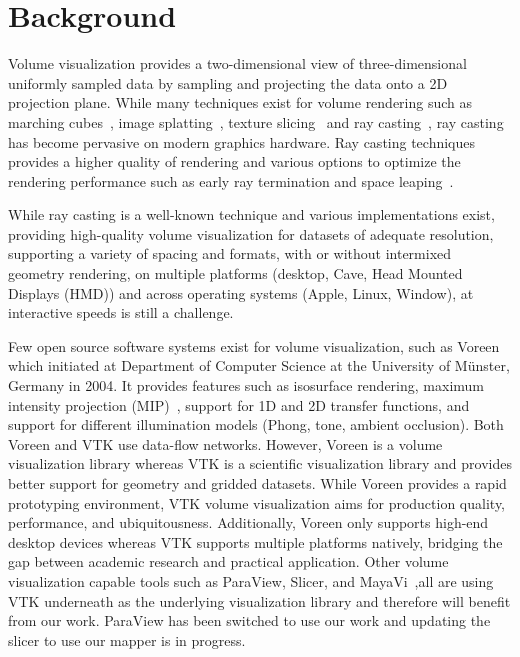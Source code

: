 \section{Background}
\label{relatedwork}

Volume visualization provides a two-dimensional view of three-dimensional
uniformly sampled data by sampling and projecting the data onto a 2D
projection plane.  While many techniques exist for volume rendering such as
marching cubes~\citep{lorensen_marching_1987}, image
splatting~\citep{westover_footprint_1990}, texture
slicing~\citep{rezk-salama_interactive_2000, engel_high-quality_2001} and ray
casting~\citep{hsu_segmented_1993, ma_parallel_1995, ma_scalable_1997,
heng_gpu-based_2005}, ray casting has become pervasive on modern graphics
hardware. Ray casting techniques provides a higher quality of rendering and
various options to optimize the rendering performance such as early ray
termination and space leaping~\citep{yagel_accelerating_1993}.

While ray casting is a well-known technique and various implementations exist,
providing high-quality volume visualization for datasets of adequate
resolution, supporting a variety of spacing and formats, with or without
intermixed geometry rendering, on multiple platforms (desktop, Cave, Head
Mounted Displays (HMD)) and across operating systems (Apple, Linux, Window), at
interactive speeds is still a challenge.

Few open source software systems exist for volume visualization, such as
Voreen~\citep{meyer-spradow_voreen:_2009} which initiated at Department of
Computer Science at the University of M\"unster, Germany in 2004.  It provides
features such as isosurface rendering, maximum intensity projection
(MIP)~\citep{wallis_three-dimensional_1989}, support for 1D and 2D transfer
functions, and support for different illumination models (Phong, tone, ambient
occlusion). Both Voreen and VTK use data-flow networks. However, Voreen is a
volume visualization library whereas VTK is a scientific visualization library
and provides better support for geometry and gridded datasets. While Voreen
provides a rapid prototyping environment, VTK volume visualization aims for
production quality, performance, and ubiquitousness. Additionally, Voreen only
supports high-end desktop devices whereas VTK supports multiple platforms
natively, bridging the gap between academic research and practical application.
Other volume visualization capable tools such as ParaView, Slicer, and
MayaVi~\citep{ramachandran2011mayavi},all are using VTK underneath as the
underlying visualization library and therefore will benefit from our work.
ParaView has been switched to use our work and updating the slicer to use
our mapper is in progress.

